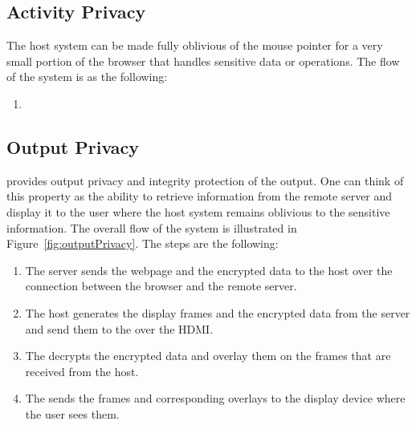 \subsection{Activity Privacy}
\label{sec:systemnDesign:mousePrivacy}

The host system can be made fully oblivious of the mouse pointer for a very small portion of the browser that handles sensitive data or operations. The flow of the system is as the following:

\begin{enumerate}
  \item 
\end{enumerate}


\subsection{Output Privacy}
\label{sec:systemDesign:outputPrivacy}

\name provides output privacy and integrity protection of the output. One can think of this property as the ability to retrieve information from the remote server and display it to the user where the host system remains oblivious to the sensitive information. The overall flow of the system is illustrated in Figure~\ref{fig:outputPrivacy}. The steps are the following:

\begin{enumerate}
  \item[\one] The server sends the webpage and the encrypted data to the host over the \http connection between the browser and the remote server.
  \item[\two] The host generates the display frames and the encrypted data from the server and send them to the \device over the HDMI.
  \item[\three] The \device decrypts the encrypted data and overlay them on the frames that are received from the host.
  \item[\four] The \device sends the frames and corresponding overlays to the display device where the user sees them.
\end{enumerate}



